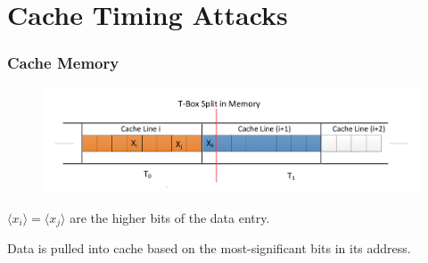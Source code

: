 \documentclass[9pt,handout]{beamer}
\begin{document}
\section{Cache Timing Attacks}
\begin{frame}
	\frametitle{Cache Memory}
\begin{figure}
\centering
\includegraphics[scale = 0.35]{images/aesCacheLines.pdf}
\end{figure}
$\langle x_i \rangle = \langle x_j \rangle$ are the higher bits of the data entry.

\medskip

Data is pulled into cache based on the most-significant bits in its address.
\end{frame}
\end{document}
